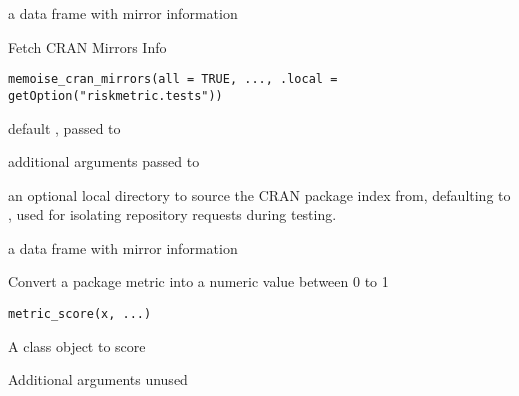 \documentclass[a4paper]{book}
\begin{document}
%
\begin{Value}
a data frame with mirror information
\end{Value}
%
\begin{Description}
Fetch CRAN Mirrors Info
\end{Description}
%
\begin{Usage}
\begin{verbatim}
memoise_cran_mirrors(all = TRUE, ..., .local = getOption("riskmetric.tests"))
\end{verbatim}
\end{Usage}
%
\begin{Arguments}
\begin{ldescription}
\item[\code{all}] default , passed to 

\item[\code{...}] additional arguments passed to 

\item[\code{.local}] an optional local directory to source the CRAN package index
from, defaulting to , used
for isolating repository requests during testing.
\end{ldescription}
\end{Arguments}
%
\begin{Value}
a data frame with mirror information
\end{Value}
%
\begin{Description}
Convert a package metric into a numeric value between 0 to 1
\end{Description}
%
\begin{Usage}
\begin{verbatim}
metric_score(x, ...)
\end{verbatim}
\end{Usage}
%
\begin{Arguments}
\begin{ldescription}
\item[\code{x}] A  class object to score

\item[\code{...}] Additional arguments unused
\end{ldescription}
\end{Arguments}
\end{document}
